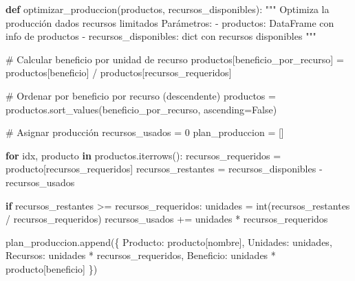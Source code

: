 \documentclass[
  doc,
  floatsintext,
  longtable,
  a4paper,
  nolmodern,
  notxfonts,
  notimes,
  12pt,
  colorlinks=true,linkcolor=blue,citecolor=blue,urlcolor=blue]{apa7}
\newenvironment{Shaded}{\begin{snugshade}}{\end{snugshade}}
\newcommand{\BuiltInTok}[1]{\textcolor[rgb]{0.00,0.23,0.31}{#1}}
\newcommand{\CommentTok}[1]{\textcolor[rgb]{0.37,0.37,0.37}{#1}}
\newcommand{\ControlFlowTok}[1]{\textcolor[rgb]{0.00,0.23,0.31}{\textbf{#1}}}
\newcommand{\DecValTok}[1]{\textcolor[rgb]{0.68,0.00,0.00}{#1}}
\newcommand{\KeywordTok}[1]{\textcolor[rgb]{0.00,0.23,0.31}{\textbf{#1}}}
\newcommand{\NormalTok}[1]{\textcolor[rgb]{0.00,0.23,0.31}{#1}}
\newcommand{\OperatorTok}[1]{\textcolor[rgb]{0.37,0.37,0.37}{#1}}
\newcommand{\StringTok}[1]{\textcolor[rgb]{0.13,0.47,0.30}{#1}}
\newcommand{\VariableTok}[1]{\textcolor[rgb]{0.07,0.07,0.07}{#1}}
\begin{document}
\begin{Shaded}
\begin{Highlighting}[]
\KeywordTok{def}\NormalTok{ optimizar\_produccion(productos, recursos\_disponibles):}
    \CommentTok{"""}
\CommentTok{    Optimiza la producción dados recursos limitados}
\CommentTok{    }
\CommentTok{    Parámetros:}
\CommentTok{    {-} productos: DataFrame con info de productos}
\CommentTok{    {-} recursos\_disponibles: dict con recursos disponibles}
\CommentTok{    """}
    
    \CommentTok{\# Calcular beneficio por unidad de recurso}
\NormalTok{    productos[}\StringTok{\textquotesingle{}beneficio\_por\_recurso\textquotesingle{}}\NormalTok{] }\OperatorTok{=}\NormalTok{ productos[}\StringTok{\textquotesingle{}beneficio\textquotesingle{}}\NormalTok{] }\OperatorTok{/}\NormalTok{ productos[}\StringTok{\textquotesingle{}recursos\_requeridos\textquotesingle{}}\NormalTok{]}
    
    \CommentTok{\# Ordenar por beneficio por recurso (descendente)}
\NormalTok{    productos }\OperatorTok{=}\NormalTok{ productos.sort\_values(}\StringTok{\textquotesingle{}beneficio\_por\_recurso\textquotesingle{}}\NormalTok{, ascending}\OperatorTok{=}\VariableTok{False}\NormalTok{)}
    
    \CommentTok{\# Asignar producción}
\NormalTok{    recursos\_usados }\OperatorTok{=} \DecValTok{0}
\NormalTok{    plan\_produccion }\OperatorTok{=}\NormalTok{ []}
    
    \ControlFlowTok{for}\NormalTok{ idx, producto }\KeywordTok{in}\NormalTok{ productos.iterrows():}
\NormalTok{        recursos\_requeridos }\OperatorTok{=}\NormalTok{ producto[}\StringTok{\textquotesingle{}recursos\_requeridos\textquotesingle{}}\NormalTok{]}
\NormalTok{        recursos\_restantes }\OperatorTok{=}\NormalTok{ recursos\_disponibles }\OperatorTok{{-}}\NormalTok{ recursos\_usados}
        
        \ControlFlowTok{if}\NormalTok{ recursos\_restantes }\OperatorTok{\textgreater{}=}\NormalTok{ recursos\_requeridos:}
\NormalTok{            unidades }\OperatorTok{=} \BuiltInTok{int}\NormalTok{(recursos\_restantes }\OperatorTok{/}\NormalTok{ recursos\_requeridos)}
\NormalTok{            recursos\_usados }\OperatorTok{+=}\NormalTok{ unidades }\OperatorTok{*}\NormalTok{ recursos\_requeridos}
            
\NormalTok{            plan\_produccion.append(\{}
                \StringTok{\textquotesingle{}Producto\textquotesingle{}}\NormalTok{: producto[}\StringTok{\textquotesingle{}nombre\textquotesingle{}}\NormalTok{],}
                \StringTok{\textquotesingle{}Unidades\textquotesingle{}}\NormalTok{: unidades,}
                \StringTok{\textquotesingle{}Recursos\textquotesingle{}}\NormalTok{: unidades }\OperatorTok{*}\NormalTok{ recursos\_requeridos,}
                \StringTok{\textquotesingle{}Beneficio\textquotesingle{}}\NormalTok{: unidades }\OperatorTok{*}\NormalTok{ producto[}\StringTok{\textquotesingle{}beneficio\textquotesingle{}}\NormalTok{]}
\NormalTok{            \})}
    

\end{Highlighting}
\end{Shaded}
\end{document}
